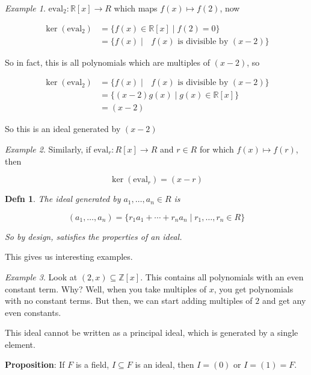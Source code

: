 \documentclass[12pt]{article}
\def\Z{{\mathbb Z}}
\def\R{{\mathbb R}}
\newtheorem{definition}{Defn}
\theoremstyle{remark}
\theoremstyle{remark}
\theoremstyle{remark}
\newtheorem{example}{Example}
\theoremstyle{remark}
\theoremstyle{remark}
\begin{document}
\begin{example}
  $\text{eval}_2: \R[x] \to R$ which maps $f(x) \mapsto f(2)$, now

  \begin{align*}
    \ker(\text{eval}_2) &= \{f(x) \in \R[x] \mid f(2) = 0\} \\
                        &= \{f(x) \mid \text{ $f(x)$ is divisible by $(x - 2)$}\}
  \end{align*}

  So in fact, this is all polynomials which are multiples of $(x - 2)$, so

  \begin{align*}
    \ker(\text{eval}_2) &= \{f(x) \mid \text{ $f(x)$ is divisible by $(x - 2)$}\} \\
                        &= \{(x - 2) g(x) \mid g(x) \in \R[x]\} \\
                        &= (x - 2)
  \end{align*}

  So this is an ideal generated by $(x - 2)$
\end{example}

\begin{example}
  Similarly, if $\text{eval}_r: R[x] \to R$ and $r \in R$ for which $f(x) \mapsto
  f(r)$, then

  \[
    \ker(\text{eval}_r) = (x - r)
  \]
\end{example}

\begin{definition}
  The ideal generated by $a_1, \dots, a_n \in R$ is 

  \[
    (a_1, \dots, a_n) = \{r_1 a_1 + \cdots + r_n a_n \mid r_1, \dots, r_n \in R \}
  \]
  
  So by design, satisfies the properties of an ideal.
\end{definition}

This gives us interesting examples.

\begin{example}
  Look at $(2, x) \subseteq \Z[x]$. This contains all polynomials with an even
  constant term. Why? Well, when you take multiples of $x$, you get polynomials
  with no constant terms. But then, we can start adding multiples of $2$ and get
  any even constants.

  This ideal cannot be written as a principal ideal, which is generated by a
  single element.
\end{example}

{\bf Proposition}: If $F$ is a field, $I \subseteq F$ is an ideal, then $I =
(0)$ or $I = (1) = F$.
\end{document}
